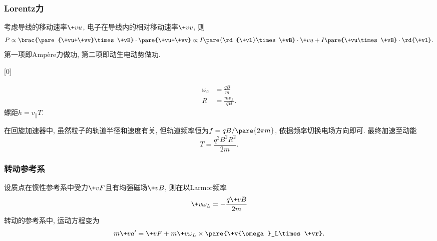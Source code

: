 \documentclass[hidelinks]{ctexart}
\begin{document}

\subsubsection{Lorentz力} %
\label{ssub:lorentz力}

\begin{remark}
    考虑导线的移动速率$\+vu$, 电子在导线内的相对移动速率$\+vv$, 则
    \[ P\propto \brac{\pare{\+vu+\+vv}\times\+vB}\cdot\pare{\+vu+\+vv} \propto I\pare{\rd{\+vl}\times\+vB}\cdot\+vu + I\pare{\+vu\times\+vB}\cdot\rd{\+vl}. \]
    第一项即Amp\`ere力做功, 第二项即动生电动势做功.
\end{remark}
\leavevmode
{}[0]\vspace*{-\baselineskip}
\begin{finale}[right skip=4cm,]
    \begin{theorem}
        [均匀磁场中的带电粒子]
        \begin{align*}
            \omega_c &= \frac{qB}{m}\\
            R &= \frac{mv_\perp}{qB}.
        \end{align*}
        螺距$h=v_\parallel T$.
    \end{theorem}
\end{finale}
\leavevmode
\begin{sample}
    \begin{ex}
        在回旋加速器中, 虽然粒子的轨道半径和速度有关, 但轨道频率恒为$f=qB/\pare{2\pi m}$, 依据频率切换电场方向即可. 最终加速至动能
        \[ T = \frac{q^2B^2R^2}{2m}. \]
    \end{ex}
\end{sample}


\subsubsection{转动参考系} %
\label{ssub:转动参考系}

\begin{finale}
    \begin{theorem}
        [Larmor频率]
        设质点在惯性参考系中受力$\+vF$且有均强磁场$\+vB$, 则在以Larmor频率
        \[ \+v{\omega}_L = -\frac{q\+vB}{2m} \]
        转动的参考系中, 运动方程变为
        \[ m\+va' = \+vF + m\+v{\omega}_L\times\pare{\+v{\omega}_L\times\+vr}. \]
    \end{theorem}
\end{finale}
\end{document}
